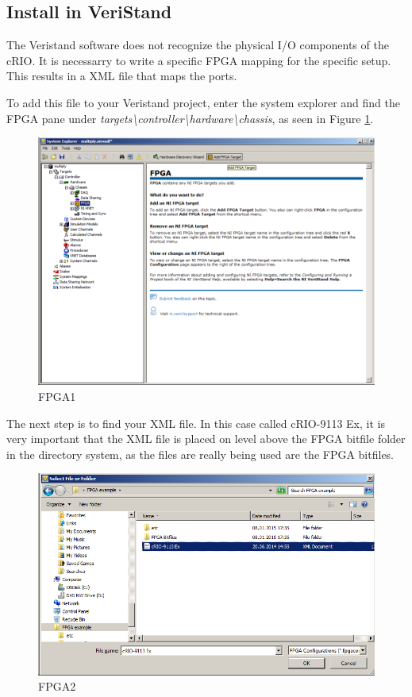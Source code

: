 \documentclass[a4paper,english]{report}
\begin{document}
\subsection{Install in VeriStand}\label{sec:install_FPGA_in_veristand}

The Veristand software does not recognize the physical I/O components of the cRIO. It is necessarry to write a specific FPGA mapping for the specific setup. This results in a XML file that maps the ports. 

To add this file to your Veristand project, enter the system explorer and find the FPGA pane under \textit{targets\textbackslash{}controller\textbackslash{}hardware\textbackslash{}chassis}, as seen in Figure \ref{fig: fpga1}. 
\begin{figure}[htb!]
	\centering \includegraphics[scale=0.45]{fig/fpga1}
	\caption{FPGA1}
	\label{fig: fpga1}
\end{figure}
The next step is to find your XML file. In this case called cRIO-9113 Ex, it is very important that the XML file is placed on level above the FPGA bitfile folder in the directory system, as the files are really being used are the FPGA bitfiles.
\begin{figure}[htb!]
	\centering \includegraphics[scale=0.45]{fig/fpga2}
	\caption{FPGA2}
	\label{fig: fpga2}
\end{figure}
\end{document}
